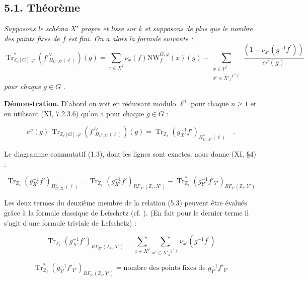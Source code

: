 \documentclass[11pt]{article}
\providecommand{\Tr}{\operatorname{Tr}}
\providecommand{\Tr}{\operatorname{Tr}}
\providecommand{\Tr}{\operatorname{Tr}}
\providecommand{\Tr}{\operatorname{Tr}}
\providecommand{\bZ}{\mathbb Z}
\providecommand{\Tr}{\operatorname{Tr}}
\begin{document}
\subsection*{5.1. Théorème}
\emph{Supposons le schéma $X'$ propre et lisse sur $k$ et supposons de plus que le nombre des points fixes de $f$ est fini. On a alors la formule suivante :
\begin{equation}\tag{5.1.1}
\Tr^*_{\bZ_\ell[G],\varphi}(f'^\vee_{H_{U',X'}(\ell)})(g) = \sum_{x \in X^f} \nu_x(f) \mathrm{NW}_f^{G,\varphi}(x)(g) - \sum_{\substack{x \in Y^f \\ x' \in {X'_x}^{g^{-1}f^{\prime}}}} \frac{(1 - \nu_{x'}(g^{-1}f^{\prime}))}{c^\varphi(g)}
\end{equation}
pour chaque $g \in G$ .}

\bigskip

\noindent
\textbf{Démonstration.} D'abord on voit en réduisant modulo $\ell^n$ pour chaque $n \geq 1$ et en utilisant (XI, 7.2.3.6) qu'on a pour chaque $g \in G$ :

\begin{equation}\tag{5.2}
c^\varphi(g) \, \Tr_{\bZ_\ell[G],\varphi}(f'^\vee_{H_{U',X'}(\ell)})(g) = \Tr_{\bZ_\ell}(g^{-1}_{X'}f')_{H^\vee_{U',X'}(\ell)} \quad .
\end{equation}

Le diagramme commutatif (1.3), dont les lignes sont exactes, nous donne (XI, \S4) :

\begin{equation}\tag{5.3}
\Tr_{\bZ_\ell}(g^{-1}_{X'}f')_{H^\vee_{U',X'}(\ell)} = \Tr_{\bZ_\ell}(g^{-1}_{X'}f')_{R\Gamma_{X'}(\bZ_\ell,X')} - \Tr^*_{\bZ_\ell}(g^{-1}_{Y'}f'_{Y'})_{R\Gamma_{Y'}(\bZ_\ell,Y')}
\end{equation}

Les deux termes du deuxième membre de la relation (5.3) peuvent être évalués grâce à la formule classique de Lefschetz (cf. ). (En fait pour le dernier terme il s'agit d'une formule triviale de Lefschetz) :

\begin{equation}\tag{5.4}
\Tr_{\bZ_\ell}(g^{-1}_{X'}f')_{R\Gamma_{X'}(\bZ_\ell,X')} = \sum_{x \in X^f} \sum_{x' \in {X'_x}^{g^{-1}f^{\prime}}} \nu_{x'}(g^{-1}f^{\prime})
\end{equation}

\begin{equation}\tag{5.5}
\Tr^*_{\bZ_\ell}(g^{-1}_{Y'}f'_{Y'})_{R\Gamma_{Y'}(\bZ_\ell,Y')} = \text{nombre des points fixes de } g^{-1}_{Y'}f'_{Y'}
\end{equation}
\end{document}
